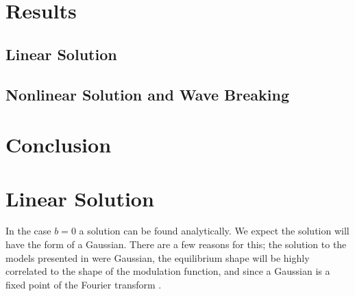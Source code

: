\documentclass[10pt,twocolumn,a4paper]{article}
\begin{document}
\section{Results}

\subsection{Linear Solution}

\subsection{Nonlinear Solution and Wave Breaking}

\section{Conclusion}


\clearpage
\newpage




\section{Linear Solution}
In the case $b = 0$ a solution can be found analytically. We expect the solution will have the form of a Gaussian. There are a few reasons for this; the solution to the models presented in \cite{cutler, siegman, kuizenga1970a, martinez1984, martinez1985} were Gaussian, the equilibrium shape will be highly correlated to the shape of the modulation function, and since a Gaussian is a fixed point of the Fourier transform \cite{gradshteyn}.
\end{document}
